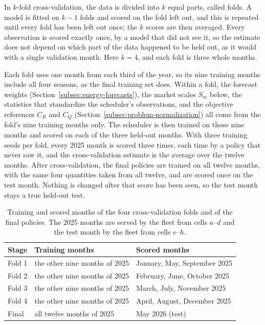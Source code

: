 \documentclass{UNCC-thesis}
\begin{document}
In \(k\)-fold cross-validation, the data is divided into \(k\) equal parts,
called folds. A model is fitted on \(k-1\) folds and scored on the fold left
out, and this is repeated until every fold has been left out once; the \(k\)
scores are then averaged. Every
observation is scored exactly once, by a model that did not see it, so the
estimate does not depend on which part of the data happened to be held out,
as it would with a single validation month. Here \(k=4\), and each fold is
three whole months. 

Each fold uses one month from each third of the year, so its nine training
months include all four seasons, as the final training set does. Within a
fold, the forecast weights (Section~\ref{subsec:energy-forecasts}), the market
scales \(S_m\) below, the statistics that standardize the scheduler's
observations, and the objective references \(C_R\) and \(C_Q\)
(Section~\ref{subsec:problem-normalization}) all come from the fold's nine
training months only. The scheduler is then trained
on those nine months and scored on each of the three held-out months. With
three training seeds per fold, every 2025 month is scored three times, each
time by a policy that never saw it, and the cross-validation estimate is the
average over the twelve months. After cross-validation, the final policies
are trained on all twelve months, with the same four quantities taken from
all twelve, and are scored once on the test month. Nothing is changed after that
score has been seen, so the test month stays a true held-out test. 

\begin{table}[htbp]
  \centering
  \footnotesize
  \caption{Training and scored months of the four cross-validation folds and
  of the final policies. The 2025 months are served by the fleet from cells
  \(a\)--\(d\) and the test month by the fleet from cells \(e\)--\(h\).}
  \label{tab:data-splits}
  \begin{tabular}{@{}lll@{}}
    \toprule
    Stage & Training months & Scored months \\
    \midrule
    Fold 1 & the other nine months of 2025 & January, May, September 2025 \\
    Fold 2 & the other nine months of 2025 & February, June, October 2025 \\
    Fold 3 & the other nine months of 2025 & March, July, November 2025 \\
    Fold 4 & the other nine months of 2025 & April, August, December 2025 \\
    \addlinespace
    Final & all twelve months of 2025 & May 2026 (test) \\
    \bottomrule
  \end{tabular}
\end{table}
\end{document}
